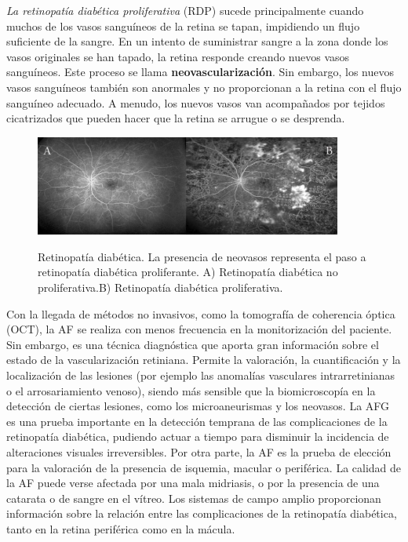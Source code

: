 \textit{La retinopatía diabética proliferativa} (RDP) sucede principalmente cuando muchos de los vasos sanguíneos de la retina se tapan, impidiendo un flujo suficiente de la sangre. En un intento de suministrar sangre a la zona donde los vasos originales se han tapado, la retina responde creando nuevos vasos sanguíneos. Este proceso se llama \textbf{neovascularizaci\'on}. Sin embargo, los nuevos vasos sanguíneos también son anormales y no proporcionan a la retina con el flujo sanguíneo adecuado. A menudo, los nuevos vasos van acompañados por tejidos cicatrizados que pueden hacer que la retina se arrugue o se desprenda.



\begin{figure}[H]
\centering
\includegraphics[width=0.9\textwidth]{./Figures/AF_RDP.png}
\label{fig:lightfilter}
\caption{Retinopatía diabética. La presencia de neovasos representa el paso a retinopatía diabética proliferante. A) Retinopatía diabética no proliferativa.B) Retinopatía diabética proliferativa.}
\end{figure}


Con la llegada de métodos no invasivos, como la tomografía de coherencia óptica (OCT), la AF se realiza con menos frecuencia en la monitorización del paciente. Sin embargo, es una técnica diagnóstica que aporta gran información sobre el estado de la vascularización retiniana. Permite la valoración, la cuantificación y la localización de las lesiones (por ejemplo las anomalías vasculares intrarretinianas o el arrosariamiento venoso), siendo más sensible que la biomicroscopía en la detección de ciertas lesiones, como los microaneurismas y los neovasos.
La AFG es una prueba importante en la detección temprana de las complicaciones de la retinopatía diabética, pudiendo actuar a tiempo para disminuir la incidencia de alteraciones visuales irreversibles. Por otra parte, la AF es la prueba de elección para la valoración de la presencia de isquemia, macular o periférica. La calidad de la AF puede verse afectada por una mala midriasis, o por la presencia de una catarata o de sangre en el vítreo. Los sistemas de campo amplio proporcionan información sobre la relación entre
las complicaciones de la retinopatía diabética, tanto en la retina periférica como en la mácula. 
\\


